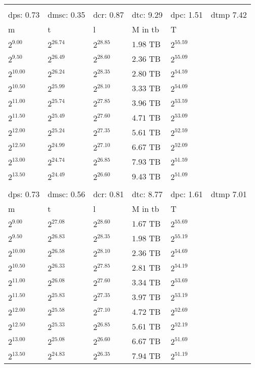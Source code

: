 \begin{tabular}{llllll}
 &  &  &  &  &  \\
dps: 0.73 & dmsc: 0.35 & dcr: 0.87 & dtc: 9.29 & dpc: 1.51 & dtmp 7.42 \\
m & t & l & M in tb & T \\
$2^{9.00}$ & $2^{26.74}$ & $2^{28.85}$ & $1.98$ TB & $2^{55.59}$ \\
$2^{9.50}$ & $2^{26.49}$ & $2^{28.60}$ & $2.36$ TB & $2^{55.09}$ \\
$2^{10.00}$ & $2^{26.24}$ & $2^{28.35}$ & $2.80$ TB & $2^{54.59}$ \\
$2^{10.50}$ & $2^{25.99}$ & $2^{28.10}$ & $3.33$ TB & $2^{54.09}$ \\
$2^{11.00}$ & $2^{25.74}$ & $2^{27.85}$ & $3.96$ TB & $2^{53.59}$ \\
$2^{11.50}$ & $2^{25.49}$ & $2^{27.60}$ & $4.71$ TB & $2^{53.09}$ \\
$2^{12.00}$ & $2^{25.24}$ & $2^{27.35}$ & $5.61$ TB & $2^{52.59}$ \\
$2^{12.50}$ & $2^{24.99}$ & $2^{27.10}$ & $6.67$ TB & $2^{52.09}$ \\
$2^{13.00}$ & $2^{24.74}$ & $2^{26.85}$ & $7.93$ TB & $2^{51.59}$ \\
$2^{13.50}$ & $2^{24.49}$ & $2^{26.60}$ & $9.43$ TB & $2^{51.09}$ \\
 &  &  &  &  &  \\
dps: 0.73 & dmsc: 0.56 & dcr: 0.81 & dtc: 8.77 & dpc: 1.61 & dtmp 7.01 \\
m & t & l & M in tb & T \\
$2^{9.00}$ & $2^{27.08}$ & $2^{28.60}$ & $1.67$ TB & $2^{55.69}$ \\
$2^{9.50}$ & $2^{26.83}$ & $2^{28.35}$ & $1.98$ TB & $2^{55.19}$ \\
$2^{10.00}$ & $2^{26.58}$ & $2^{28.10}$ & $2.36$ TB & $2^{54.69}$ \\
$2^{10.50}$ & $2^{26.33}$ & $2^{27.85}$ & $2.81$ TB & $2^{54.19}$ \\
$2^{11.00}$ & $2^{26.08}$ & $2^{27.60}$ & $3.34$ TB & $2^{53.69}$ \\
$2^{11.50}$ & $2^{25.83}$ & $2^{27.35}$ & $3.97$ TB & $2^{53.19}$ \\
$2^{12.00}$ & $2^{25.58}$ & $2^{27.10}$ & $4.72$ TB & $2^{52.69}$ \\
$2^{12.50}$ & $2^{25.33}$ & $2^{26.85}$ & $5.61$ TB & $2^{52.19}$ \\
$2^{13.00}$ & $2^{25.08}$ & $2^{26.60}$ & $6.67$ TB & $2^{51.69}$ \\
$2^{13.50}$ & $2^{24.83}$ & $2^{26.35}$ & $7.94$ TB & $2^{51.19}$ \\

\end{tabular}
